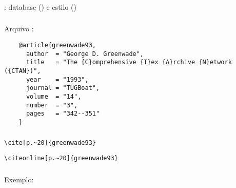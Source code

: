 \begin{frame}[standout]
  \Huge
\end{frame}

\begin{frame}
  \frametitle{}
  \Huge
  : database () e estilo ()
\end{frame}

\begin{frame}[fragile]
  \frametitle{}
  \Huge
  Arquivo :

  \begin{verbatim}
    @article{greenwade93,
      author  = "George D. Greenwade",
      title   = "The {C}omprehensive {T}ex {A}rchive {N}etwork ({CTAN})",
      year    = "1993",
      journal = "TUGBoat",
      volume  = "14",
      number  = "3",
      pages   = "342--351"
    }
  \end{verbatim}
\end{frame}

\begin{frame}[fragile]
  \frametitle{}
  \LARGE
  \verb++
\end{frame}

\begin{frame}[fragile]
  \frametitle{}
  \LARGE
  \verb+\cite[p.~20]{greenwade93}+

  \verb+\citeonline[p.~20]{greenwade93}+
\end{frame}

\begin{frame}
  \frametitle{}
  \Huge
  Exemplo: 
\end{frame}
